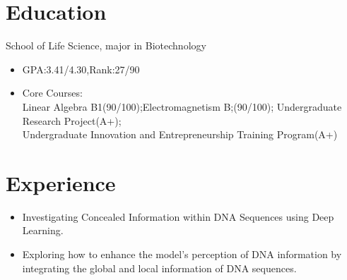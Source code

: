 \documentclass{resume}
\begin{document}



\section{Education}

School of Life Science, major in Biotechnology 
\begin{itemize}
  \item GPA:3.41/4.30,Rank:27/90
  \item Core Courses: \\Linear Algebra B1(90/100);Electromagnetism B;(90/100); Undergraduate 
  Research Project(A+);\\Undergraduate Innovation and Entrepreneurship Training Program(A+)
\end{itemize}


\section{Experience}

    \begin{itemize}
      \item Investigating Concealed Information within DNA Sequences using Deep Learning.
      \item Exploring how to enhance the model’s perception of DNA information by integrating the global and local information of DNA sequences.
    \end{itemize}
\end{document}
